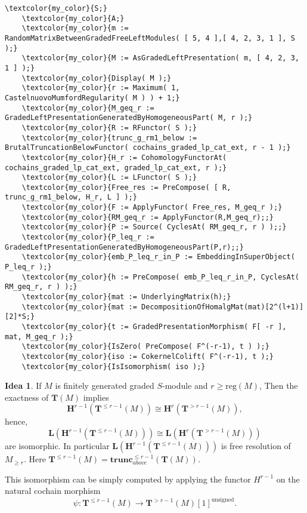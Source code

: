 \documentclass[16pt,a4paper]{extarticle}
\theoremstyle{definition}
\newtheorem{idea}{Idea}
\theoremstyle{theorem}
\newcommand{\LL}{\mathbf{L}}
\newcommand{\HH}{\mathbf{H}}
\newcommand{\TT}{\mathbf{T}}
\newcommand{\trunc}{\mathbf{trunc}}
\begin{document}
\begin{Verbatim}[commandchars=\\\{\}, fontseries=b, frame=single, label=Gap Code, framerule=0.5mm, rulecolor=\color{rule_color}]
    \textcolor{my_color}{S;}
    \textcolor{my_color}{A;}
    \textcolor{my_color}{m := RandomMatrixBetweenGradedFreeLeftModules( [ 5, 4 ],[ 4, 2, 3, 1 ], S );}
    \textcolor{my_color}{M := AsGradedLeftPresentation( m, [ 4, 2, 3, 1 ] );}
    \textcolor{my_color}{Display( M );}
    \textcolor{my_color}{r := Maximum( 1, CastelnuovoMumfordRegularity( M ) ) + 1;}
    \textcolor{my_color}{M_geq_r := GradedLeftPresentationGeneratedByHomogeneousPart( M, r );}
    \textcolor{my_color}{R := RFunctor( S );}
    \textcolor{my_color}{trunc_g_rm1_below := BrutalTruncationBelowFunctor( cochains_graded_lp_cat_ext, r - 1 );}
    \textcolor{my_color}{H_r := CohomologyFunctorAt( cochains_graded_lp_cat_ext, graded_lp_cat_ext, r );}
    \textcolor{my_color}{L := LFunctor( S );}
    \textcolor{my_color}{Free_res := PreCompose( [ R, trunc_g_rm1_below, H_r, L ] );}
    \textcolor{my_color}{F := ApplyFunctor( Free_res, M_geq_r );}
    \textcolor{my_color}{RM_geq_r := ApplyFunctor(R,M_geq_r);;}
    \textcolor{my_color}{P := Source( CyclesAt( RM_geq_r, r ) );;}
    \textcolor{my_color}{P_leq_r := GradedLeftPresentationGeneratedByHomogeneousPart(P,r);;}
    \textcolor{my_color}{emb_P_leq_r_in_P := EmbeddingInSuperObject( P_leq_r );}
    \textcolor{my_color}{h := PreCompose( emb_P_leq_r_in_P, CyclesAt( RM_geq_r, r ) );}
    \textcolor{my_color}{mat := UnderlyingMatrix(h);}
    \textcolor{my_color}{mat := DecompositionOfHomalgMat(mat)[2^(l+1)][2]*S;}
    \textcolor{my_color}{t := GradedPresentationMorphism( F[ -r ], mat, M_geq_r );}
    \textcolor{my_color}{IsZero( PreCompose( F^(-r-1), t ) );}
    \textcolor{my_color}{iso := CokernelColift( F^(-r-1), t );}
    \textcolor{my_color}{IsIsomorphism( iso );}
\end{Verbatim}
    
\begin{idea}
    If $M$ is finitely generated graded $S$-module and $r\geq\mathrm{reg}(M)$, Then the exactness of $\TT(M)$ implies
    $$\HH^{r-1}( \TT^{\leq r-1}(M)) \cong \HH^r( \TT^{> r-1}(M)),$$ hence, 
    $$\LL(\HH^{r-1}( \TT^{\leq r-1}(M)) ) \cong  \LL(\HH^r( \TT^{> r-1}(M)) )$$ are isomorphic. In particular 
    $\LL(\HH^{r-1}( \TT^{\leq r-1}(M)) )$ is free resolution of $M_{\geq r}$.
    Here $\TT^{\leq r-1}(M) = \trunc^{\leq r-1}_{above}(\TT(M))$.

    This isomorphism can be simply computed by applying the functor $H^{r-1}$ on the 
    natural cochain morphism 
    $$\psi: \TT^{\leq r-1}(M)\rightarrow \TT^{> r-1}(M)[1]^{\mathrm{unsigned}}.$$
    
\end{idea}
\end{document}
